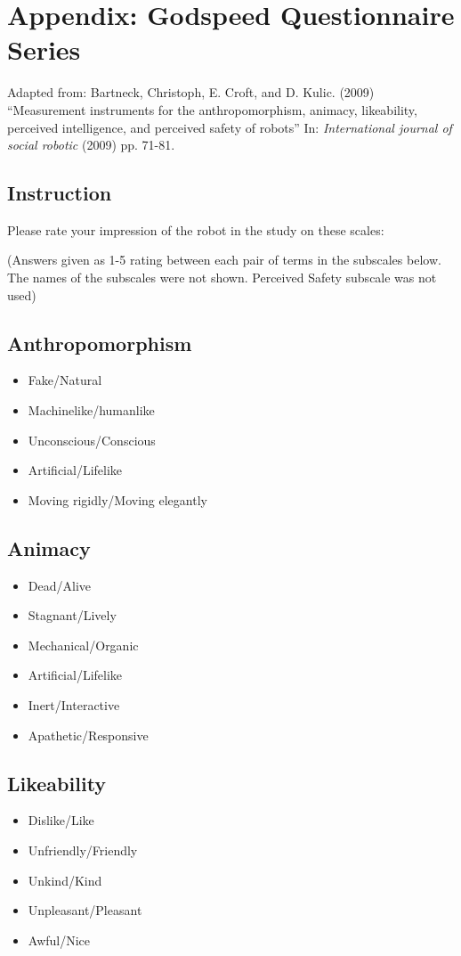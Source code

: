 \chapter{Appendix: Godspeed Questionnaire Series}
\label{chap_app_godspeed}
Adapted from: Bartneck, Christoph, E. Croft, and D. Kulic. (2009) ``Measurement instruments for the anthropomorphism, animacy, likeability, perceived intelligence, and perceived safety of robots'' In: \textit{International journal of social robotic} (2009) pp. 71-81.

\section{Instruction}
Please rate your impression of the robot in the study on these scales:

(Answers given as 1-5 rating between each pair of terms in the subscales below. The names of the subscales were not shown. Perceived Safety subscale was not used)

\section{Anthropomorphism}
\begin{itemize}
\item Fake/Natural
\item Machinelike/humanlike
\item Unconscious/Conscious
\item Artificial/Lifelike
\item Moving rigidly/Moving elegantly 
\end{itemize}

\section{Animacy}
\begin{itemize}
\item Dead/Alive
\item Stagnant/Lively
\item Mechanical/Organic
\item Artificial/Lifelike
\item Inert/Interactive
\item Apathetic/Responsive
\end{itemize}


\section{Likeability}
\begin{itemize}
\item Dislike/Like
\item Unfriendly/Friendly
\item Unkind/Kind
\item Unpleasant/Pleasant
\item Awful/Nice 
\end{itemize}

